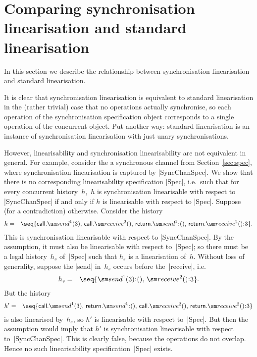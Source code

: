\section{Comparing synchronisation linearisation and standard linearisation}
\label{sec:relating}

In this section we describe the relationship between synchronisation
linearisation and standard linearisation.

It is clear that synchronisation linearisation is equivalent to standard
linearisation in the (rather trivial) case that no operations actually
synchronise, so each operation of the synchronisation specification object
corresponds to a single operation of the concurrent object.  Put another way:
standard linearisation is an instance of synchronisation linearisation with
just unary synchronisations.

However, linearisability and synchronisation linearisability are not
equivalent in general.
%
For example, consider the a synchronous channel from Section~\ref{sec:spec},
where synchronisation linearisation is captured by |SyncChanSpec|.  We show
that there is no corresponding linearisability specification |Spec|, i.e.~such
that for every concurrent history~$h$,\, $h$ is synchronisation linearisable
with respect to |SyncChanSpec| if and only if $h$ is linearisable with respect
to |Spec|.  Suppose (for a contradiction) otherwise.  Consider the history
\begin{eqnarray*}
h & = & \seq{ 
  \call.\send^1(3),\, \call.\receive^2(),\, 
  \return.\send^1\::(),\, \return.\receive^2()\::3 }.
\end{eqnarray*}
%
This is synchronisation linearisable with respect to |SyncChanSpec|.  By the
assumption, it must also be linearisable with respect to~|Spec|; so there must
be a legal history~$h_s$ of~|Spec| such that $h_s$ is a linearisation of~$h$.
Without loss of generality, suppose the |send| in~$h_s$ occurs before
the~|receive|, i.e.
\begin{eqnarray*}
h_s & = & \seq{ \send^1(3)\::(),\, \receive^2()\::3 }.
\end{eqnarray*}
%
But the history
%
\begin{eqnarray*}
h' & = & \seq{ 
  \call.\send^1(3),\, \return.\send^1\::(),\, 
  \call.\receive^2(),\, \return.\receive^2()\::3 }
\end{eqnarray*}
%
is also linearised by~$h_s$, so $h'$ is linearisable with respect to~|Spec|.
But then the assumption would imply that $h'$ is synchronisation linearisable
with respect to~|SyncChanSpec|.  This is clearly false, because the operations
do not overlap.  Hence no such linearisability specification~|Spec| exists.


